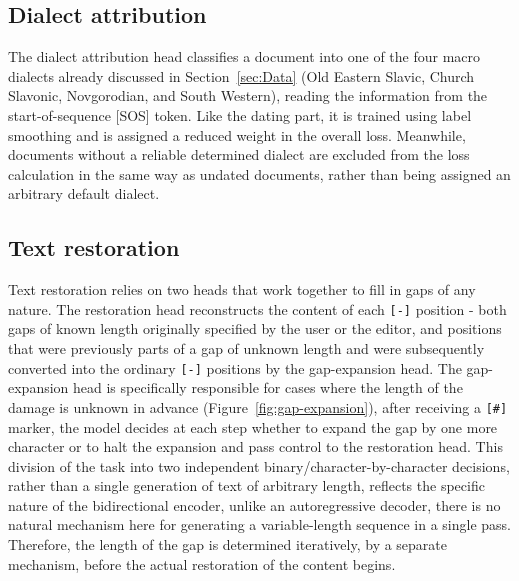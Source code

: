 \documentclass{article}
\begin{document}
\subsection{Dialect attribution}
The dialect attribution head classifies a document into one of the four macro dialects already discussed in Section~\ref{sec:Data} (Old Eastern Slavic, Church Slavonic, Novgorodian, and South Western), reading the information from the start-of-sequence [SOS] token. Like the dating part, it is trained using label smoothing and is assigned a reduced weight in the overall loss. Meanwhile, documents without a reliable determined dialect are excluded from the loss calculation in the same way as undated documents, rather than being assigned an arbitrary default dialect.

\subsection{Text restoration}
Text restoration relies on two heads that work together to fill in gaps of any nature. The restoration head reconstructs the content of each \texttt{[-]} position - both gaps of known length originally specified by the user or the editor, and positions that were previously parts of a gap of unknown length and were subsequently converted into the ordinary \texttt{[-]} positions by the gap-expansion head. The gap-expansion head is specifically responsible for cases where the length of the damage is unknown in advance (Figure~\ref{fig:gap-expansion}), after receiving a \texttt{[\#]} marker, the model decides at each step whether to expand the gap by one more character or to halt the expansion and pass control to the restoration head. This division of the task into two independent binary/character-by-character decisions, rather than a single generation of text of arbitrary length, reflects the specific nature of the bidirectional encoder, unlike an autoregressive decoder, there is no natural mechanism here for generating a variable-length sequence in a single pass. Therefore, the length of the gap is determined iteratively, by a separate mechanism, before the actual restoration of the content begins.
\end{document}

